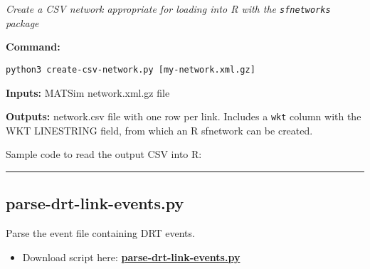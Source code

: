 \emph{Create a CSV network appropriate for loading into R with the
\texttt{sfnetworks} package}

\textbf{Command:}

\texttt{python3\ create-csv-network.py\ {[}my-network.xml.gz{]}}

\textbf{Inputs:} MATSim network.xml.gz file

\textbf{Outputs:} network.csv file with one row per link. Includes a
\texttt{wkt} column with the WKT LINESTRING field, from which an R
sfnetwork can be created.

Sample code to read the output CSV into R:

\begin{Shaded}
\begin{Highlighting}[]

\OtherTok{\textless{}{-}} \NormalTok{(}\NormalTok{(}\NormalTok{), }\NormalTok{, }\NormalTok{)}
\OtherTok{\textless{}{-}} 

\NormalTok{() }\SpecialCharTok{+}
  \NormalTok{(}\NormalTok{), }\NormalTok{) }\SpecialCharTok{+}
  \NormalTok{(}\NormalTok{), }\NormalTok{(}\NormalTok{)}
\end{Highlighting}
\end{Shaded}

\begin{center}\rule{0.5\linewidth}{0.5pt}\end{center}

\hypertarget{parse-drt-link-events.py}{%
\subsection{parse-drt-link-events.py}\label{parse-drt-link-events.py}}

Parse the event file containing DRT events.

\begin{itemize}
\tightlist
\item
  Download script here:
  \textbf{\href{https://raw.githubusercontent.com/simwrapper/simwrapper/master/scripts/parse-drt-link-events.py}{parse-drt-link-events.py}}
\end{itemize}

